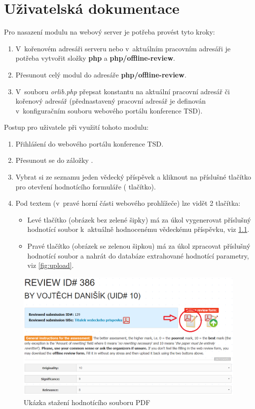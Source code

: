 \chapter{Uživatelská dokumentace}
Pro nasazení modulu na webový server je potřeba provést tyto kroky:
\begin{enumerate}
	\item V~kořenovém adresáři serveru nebo v~aktuálním pracovním adresáři je potřeba vytvořit složky \textbf{php} a \textbf{php/offline-review}.
	\item Přesunout celý modul do adresáře \textbf{php/offline-review}.
	\item V~souboru \textit{orlib.php} přepsat konstantu  na aktuální pracovní adresář či kořenový adresář (přednastavený pracovní adresář je definován v~konfiguračním souboru webového portálu konference TSD).
\end{enumerate}


Postup pro uživatele při využití tohoto modulu:
\begin{enumerate}
	\item Přihlášení do webového portálu konference TSD.
	\item Přesunout se do záložky .
	\item Vybrat si ze seznamu jeden vědecký příspěvek a kliknout na příslušné tlačítko pro otevření hodnotícího formuláře ( tlačítko).
	\item Pod textem  (v~pravé horní části webového prohlížeče) lze vidět 2 tlačítka:
	\begin{itemize}
		\item Levé tlačítko (obrázek bez zelené šipky) má za úkol vygenerovat příslušný hodnotící soubor k~aktuálně hodnocenému vědeckému příspěvku, viz \ref{fig:download}.
		\item Pravé tlačítko (obrázek se zelenou šipkou) má za úkol zpracovat příslušný hodnotící soubor a nahrát do databáze extrahované hodnotící parametry, viz \ref{fig:upload}.
	\end{itemize}
\end{enumerate}

\begin{figure}[h!]
\centering
\includegraphics[width=12cm]{img/download}
\caption{Ukázka stažení hodnotícího souboru PDF}
\label{fig:download}
\end{figure}


